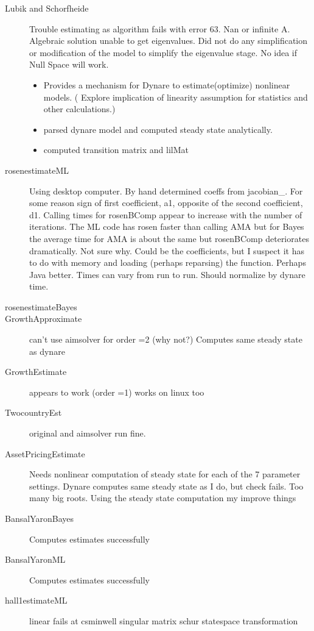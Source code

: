 \documentclass[12pt]{elsart}
\begin{document}
\begin{description}
\item[Lubik and Schorfheide] Trouble estimating as algorithm fails with error 63. Nan or infinite A.  Algebraic solution unable to get eigenvalues.  Did not do any simplification or modification of the model to simplify the eigenvalue stage. No idea if Null Space will work.

  \begin{itemize}
\item Provides a mechanism for Dynare to estimate(optimize) nonlinear models.
  ( Explore
implication of linearity assumption for statistics and other calculations.)
  \item parsed dynare model and computed steady state analytically.
  \item computed transition matrix and lilMat
  \end{itemize}
\item[rosenestimateML] 
Using desktop computer. By hand determined coeffs from jacobian\_.  For some reason sign of  first coefficient, a1,  opposite of the second coefficient, d1.
Calling times for rosenBComp appear to increase with the number of iterations.
The ML code has rosen faster than calling AMA but for Bayes the average time
for AMA is about the same but rosenBComp deteriorates dramatically.  Not sure why.  Could be the coefficients, but I suspect it has to do with memory and
loading (perhaps reparsing) the function. Perhaps Java better.  Times can vary from run to run.  Should normalize by dynare time. 
\item[rosenestimateBayes]
\item[GrowthApproximate] can't use aimsolver for order =2  (why not?)  Computes same steady state as dynare
\item[GrowthEstimate] appears to work (order =1)  works on linux too
\item[TwocountryEst] original and aimsolver run fine.
\item[AssetPricingEstimate] Needs nonlinear computation of steady state for each of the 7 parameter settings. Dynare computes same steady state as I do, but check fails. Too many big roots. Using the steady state computation my improve things
\item[BansalYaronBayes] Computes estimates successfully
\item[BansalYaronML] Computes estimates successfully
\item[hall1estimateML] linear fails at csminwell  singular matrix schur statespace transformation

\end{description}
\end{document}
